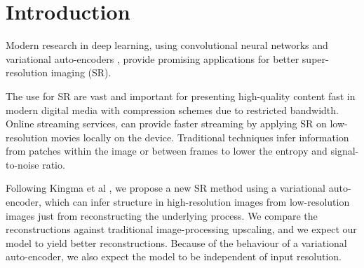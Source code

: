 \section{Introduction}
\label{sec:introduction}


Modern research in deep learning, using convolutional neural networks \cite{Dong15} and variational auto-encoders \cite{Kingma2013, Johnson16}, provide promising applications for better super-resolution imaging (SR).

The use for SR are vast and important for presenting high-quality content fast in modern digital media with compression schemes due to restricted bandwidth.
Online streaming services, can provide faster streaming by applying SR on low-resolution movies locally on the device.
Traditional techniques infer information from patches within the image or between frames to lower the entropy and signal-to-noise ratio. 


Following Kingma et al \cite{Kingma2013}, we propose a new SR method using a variational auto-encoder, which can infer structure in high-resolution images from low-resolution images just from reconstructing the underlying process. We compare the reconstructions against traditional image-processing upscaling, and we expect our model to yield better reconstructions. Because of the behaviour of a variational auto-encoder, we also expect the model to be independent of input resolution.
